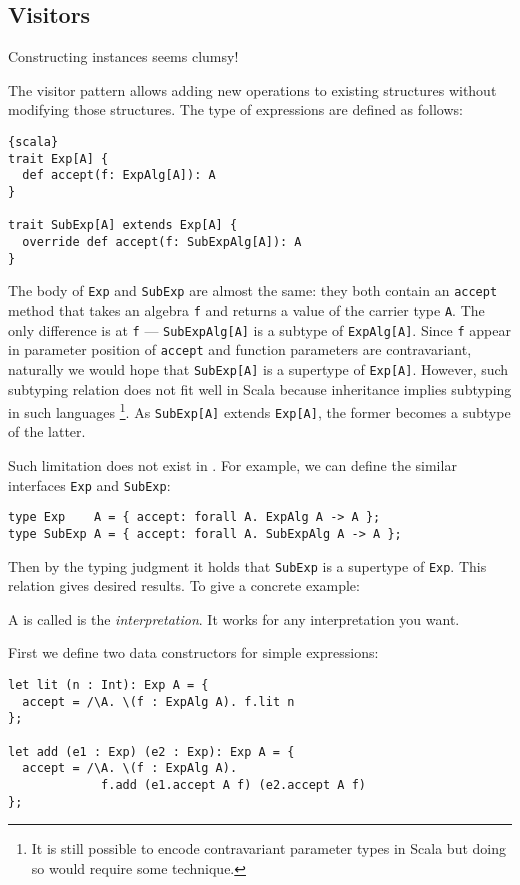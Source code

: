 \subsection{Visitors}

Constructing instances seems clumsy!

The visitor pattern allows adding new operations to existing structures without
modifying those structures. The type of expressions are defined as follows:

\begin{lstlisting}{scala}
trait Exp[A] {
  def accept(f: ExpAlg[A]): A
}

trait SubExp[A] extends Exp[A] {
  override def accept(f: SubExpAlg[A]): A
}
\end{lstlisting}

The body of \lstinline{Exp} and \lstinline{SubExp} are almost the same: they
both contain an \lstinline{accept} method that takes an algebra \lstinline{f}
and returns a value of the carrier type \lstinline{A}. The only difference is at
\lstinline{f} --- \lstinline{SubExpAlg[A]} is a subtype of
\lstinline{ExpAlg[A]}. Since \lstinline{f} appear in parameter position of
\lstinline{accept} and function parameters are contravariant, naturally we would
hope that \lstinline{SubExp[A]} is a supertype of \lstinline{Exp[A]}. However,
such subtyping relation does not fit well in Scala because inheritance implies
subtyping in such languages \footnote{It is still possible to encode
  contravariant parameter types in Scala but doing so would require some
  technique.}. As \lstinline{SubExp[A]} extends \lstinline{Exp[A]}, the former
becomes a subtype of the latter.

Such limitation does not exist in \name. For example, we can define the similar interfaces \lstinline{Exp} and \lstinline{SubExp}:
\begin{lstlisting}
type Exp    A = { accept: forall A. ExpAlg A -> A };
type SubExp A = { accept: forall A. SubExpAlg A -> A };
\end{lstlisting}
Then by the typing judgment it holds that \lstinline{SubExp} is a supertype of
\lstinline{Exp}. This relation gives desired results. To give a concrete example:

A is called is the \emph{interpretation}. It works for any interpretation you want.

First we define two data constructors for simple expressions:
\begin{lstlisting}
let lit (n : Int): Exp A = {
  accept = /\A. \(f : ExpAlg A). f.lit n
};

let add (e1 : Exp) (e2 : Exp): Exp A = {
  accept = /\A. \(f : ExpAlg A).
             f.add (e1.accept A f) (e2.accept A f)
};
\end{lstlisting}

